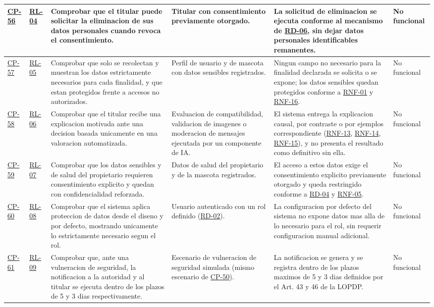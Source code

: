 \documentclass[journal,onecolumn]{IEEEtran}
\begin{document}
\begin{landscape}
\begin{longtable}{@{}p{1.3cm} p{1.3cm} p{4.6cm} p{3.6cm} p{5.2cm} p{1.6cm}@{}}
			\hyperref[cp:56]{CP-56}\label{cp:56} & \hyperref[rl:04]{RL-04} & Comprobar que el titular puede solicitar la eliminacion de sus datos personales cuando revoca el consentimiento. & Titular con consentimiento previamente otorgado. & La solicitud de eliminacion se ejecuta conforme al mecanismo de \hyperref[tab:RD-06]{RD-06}, sin dejar datos personales identificables remanentes. & No funcional \\ \midrule
			\hyperref[cp:57]{CP-57}\label{cp:57} & \hyperref[rl:05]{RL-05} & Comprobar que solo se recolectan y muestran los datos estrictamente necesarios para cada finalidad, y que estan protegidos frente a accesos no autorizados. & Perfil de usuario y de mascota con datos sensibles registrados. & Ningun campo no necesario para la finalidad declarada se solicita o se expone; los datos sensibles quedan protegidos conforme a \hyperref[tab:RNF-01]{RNF-01} y \hyperref[tab:RNF-16]{RNF-16}. & No funcional \\ \midrule
			\hyperref[tab:CP-58]{CP-58} & \hyperref[rl:06]{RL-06} & Comprobar que el titular recibe una explicacion motivada ante una decision basada unicamente en una valoracion automatizada. & Evaluacion de compatibilidad, validacion de imagenes o moderacion de mensajes ejecutada por un componente de IA. & El sistema entrega la explicacion causal, por contraste o por ejemplos correspondiente (\hyperref[tab:RNF-13]{RNF-13}, \hyperref[tab:RNF-14]{RNF-14}, \hyperref[tab:RNF-15]{RNF-15}), y no presenta el resultado como definitivo sin ella. & No funcional \\ \midrule
			\hyperref[cp:59]{CP-59}\label{cp:59} & \hyperref[rl:07]{RL-07} & Comprobar que los datos sensibles y de salud del propietario requieren consentimiento explicito y quedan con confidencialidad reforzada. & Datos de salud del propietario y de la mascota registrados. & El acceso a estos datos exige el consentimiento explicito previamente otorgado y queda restringido conforme a \hyperref[tab:RD-04]{RD-04} y \hyperref[tab:RNF-05]{RNF-05}. & No funcional \\ \midrule
			\hyperref[cp:60]{CP-60}\label{cp:60} & \hyperref[rl:08]{RL-08} & Comprobar que el sistema aplica proteccion de datos desde el diseno y por defecto, mostrando unicamente lo estrictamente necesario segun el rol. & Usuario autenticado con un rol definido (\hyperref[tab:RD-02]{RD-02}). & La configuracion por defecto del sistema no expone datos mas alla de lo necesario para el rol, sin requerir configuracion manual adicional. & No funcional \\ \midrule
			\hyperref[cp:61]{CP-61}\label{cp:61} & \hyperref[rl:09]{RL-09} & Comprobar que, ante una vulneracion de seguridad, la notificacion a la autoridad y al titular se ejecuta dentro de los plazos de 5 y 3 dias respectivamente. & Escenario de vulneracion de seguridad simulada (mismo escenario de \hyperref[cp:50]{CP-50}). & La notificacion se genera y se registra dentro de los plazos maximos de 5 y 3 dias definidos por el Art. 43 y 46 de la LOPDP. & No funcional \\ \midrule


\end{longtable}
\end{landscape}
\end{document}
